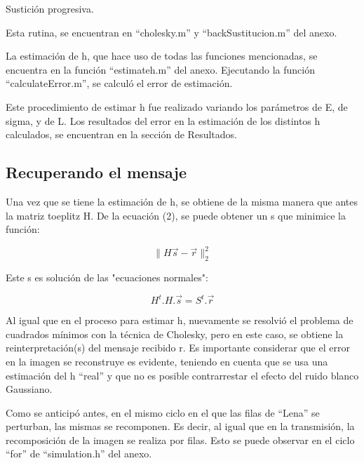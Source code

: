 \documentclass{article}
\begin{document}
\begin{multicols}{2}
\par Sustición progresiva.


\par Esta rutina, se encuentran en “cholesky.m” y “backSustitucion.m” del anexo.
\par La estimación de h, que hace uso de todas las funciones mencionadas, se encuentra en la función “estimateh.m” del anexo. Ejecutando la función “calculateError.m”, se calculó el error de estimación.
\par Este procedimiento de estimar h fue realizado variando los parámetros de E, de sigma, y de L. Los resultados del error en la estimación de los distintos h calculados, se encuentran en la sección de Resultados.

\subsection{Recuperando el mensaje}
\label{sec2}


\par Una vez que se tiene la estimación de h, se obtiene de la misma manera que antes la matriz toeplitz H. De la ecuación (2), se puede obtener un s que minimice la función:

\begin{equation}
\label{eq4}
\| H\vec{s} -\vec{r}\|_2^2
\end{equation}

\par Este s es solución de las "ecuaciones normales":

\begin{equation}
\label{eq5}
H^t.H.\vec{s} = S^t.\vec{r}
\end{equation}

\par Al igual que en el proceso para estimar h, nuevamente se resolvió el problema de cuadrados mínimos con la técnica de Cholesky, pero en este caso, se obtiene la reinterpretación(s) del mensaje recibido r. Es importante considerar que el error en la imagen se reconstruye es evidente, teniendo en cuenta que se usa una estimación del h “real” y que no es posible contrarrestar el efecto del ruido blanco Gaussiano.	
\par Como se anticipó antes, en el mismo ciclo en el que las filas de “Lena” se perturban, las mismas se recomponen. Es decir, al igual que en la transmisión, la recomposición de la imagen se realiza por filas. Esto se puede observar en el ciclo “for” de “simulation.h” del anexo.


\end{multicols}
\end{document}
